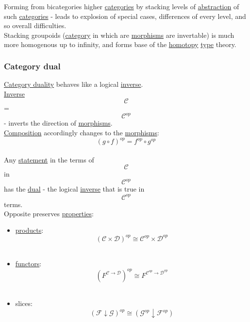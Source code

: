 \documentclass[11pt]{article}
\begin{document}
Forming from bicategories higher \hyperref[org43ea200]{categories} by stacking levels of \hyperref[orgd787547]{abstraction} of such \hyperref[org43ea200]{categories} - leads to explosion of special cases, differences of every level, and so overall difficulties.\\

Stacking groupoids (\hyperref[org3e3a79b]{category} in which are \hyperref[org8ed0ce8]{morphisms} are invertable) is much more homogenous up to infinity, and forms base of the \hyperref[orgc7221e4]{homotopy} \hyperref[org4fbaeb8]{type} theory.\\

\subsubsection{\label{org57dced6}Category dual}
\label{sec:org47edb1b}
\hyperref[orge0bc871]{Category duality} behaves like a logical \hyperref[org41275e7]{inverse}.\\

\hyperref[org41275e7]{Inverse} $$ \mathcal{C} $$ = $$ \mathcal{C}^{op} $$ - inverts the direction of \hyperref[org8ed0ce8]{morphisms}.\\

\hyperref[org24a8abd]{Composition} accordingly changes to the \hyperref[org8ed0ce8]{morphisms}: $$ (g \circ f)^{op} = f^{op} \circ g^{op} $$\\

Any \hyperref[org0fdd00d]{statement} in the terms of $$ \mathcal{C} $$ in $$ \mathcal{C}^{op} $$ has the \hyperref[org0a6da4c]{dual} - the logical \hyperref[org41275e7]{inverse} that is true in $$ \mathcal {C}^{op} $$ terms.\\

Opposite preserves \hyperref[org763ad6b]{properties}:\\
\begin{itemize}
\item \hyperref[org17afff4]{products}: $$ (\mathcal{C} \times \mathcal{D})^{op} \cong \mathcal{C}^{op} \times \mathcal{D}^{op} $$\\

\item \hyperref[org6c3c2a6]{functors}: $$ (F^{\mathcal{C} \to \mathcal{D}})^{op} \cong F^{\mathcal{C}^{op} \to \mathcal{D}^{op}} $$\\

\item slices: $$ (\mathcal{F} \downarrow \mathcal{G})^{op} \cong (\mathcal{G}^{op} \downarrow \mathcal{F}^{op}) $$\\
\end{itemize}
\end{document}
